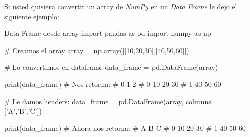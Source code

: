 Si usted quisiera convertir un array de \textit{NumPy} en un \textit{Data Frame} le dejo el siguiente ejemplo:
\begin{pycode}{Data Frame desde array}
import pandas as pd
import numpy as np 

# Creamos el array
array = np.array([[10,20,30],[40,50,60]])

# Lo convertimos en dataframe
data_frame = pd.DataFrame(array)

print(data_frame) # Nos retorna: 
#     0   1   2
# 0  10  20  30
# 1  40  50  60

# Le damos headers:
data_frame = pd.DataFrame(array, columns = ['A','B','C'])

print(data_frame) # Ahora nos retorna: 
#     A   B   C
# 0  10  20  30
# 1  40  50  60
\end{pycode}